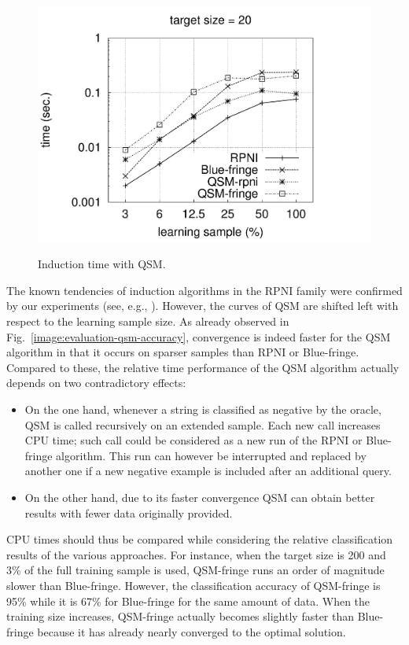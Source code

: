 \begin{figure}[t]
{  \includegraphics[trim=30mm 0mm 35mm 0mm, clip, page=4]{src/5-evaluation/images/time}
}
\caption{Induction time with QSM\label{image:evaluation-qsm-time}.}
\end{figure}

The known tendencies of induction algorithms in the RPNI family were confirmed by our experiments (see, e.g., \cite{Lang:1998}). However, the curves of QSM are shifted left with respect to the learning sample size. As already observed in Fig.~\ref{image:evaluation-qsm-accuracy}, convergence is indeed faster for the QSM algorithm in that it occurs on sparser samples than RPNI or Blue-fringe. Compared to these, the relative time performance of the QSM algorithm actually depends on two contradictory effects:
\begin{itemize}
\item On the one hand, whenever a string is classified as negative by the oracle, QSM is called recursively on an extended sample. Each new call increases CPU time; such call could be considered as a new run of the RPNI or Blue-fringe algorithm. This run can however be interrupted and replaced by another one if a new negative example is included after an additional query.
\item On the other hand, due to its faster convergence QSM can obtain better results with fewer data originally provided. 
\end{itemize}
 
CPU times should thus be compared while considering the relative classification results of the various approaches. For instance, when the target size is 200 and 3\% of the full training sample is used, QSM-fringe runs an order of magnitude slower than Blue-fringe. However, the classification accuracy of QSM-fringe is 95\% while it is 67\% for Blue-fringe for the same amount of data. When the training size increases, QSM-fringe actually becomes slightly faster than Blue-fringe because it has already nearly converged to the optimal solution.

